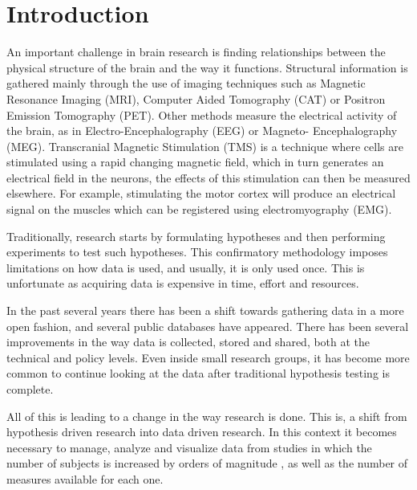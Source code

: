 \documentclass[utf8,paper]{frontiersSCNS} %
\begin{document}




\section{Introduction}


An important challenge in brain research is finding relationships between the physical structure of the brain and the way it functions. Structural information is gathered mainly through the use of imaging techniques such as Magnetic Resonance Imaging (MRI), Computer Aided Tomography (CAT) or Positron Emission Tomography (PET). Other methods measure the electrical activity of the brain, as in Electro-Encephalography (EEG) or Magneto- Encephalography (MEG). Transcranial Magnetic Stimulation (TMS) is a technique where cells are stimulated using a rapid changing magnetic field, which in turn generates an electrical field in the neurons, the effects of this stimulation can then be measured elsewhere. For example, stimulating the motor cortex will produce an electrical signal on the muscles which can be registered using electromyography (EMG).
					
Traditionally, research starts by formulating hypotheses and then performing experiments to test such hypotheses. This  confirmatory methodology imposes limitations on how data is used, and usually, it is only used once. This is unfortunate as acquiring data is expensive in time, effort and resources.
					
In the past several years there has been a shift towards gathering data in a more open fashion, and several public databases have appeared. There has been several improvements in the way data is collected, stored and shared, both at the technical and policy levels. Even inside small research groups, it has become more common to continue looking at the data after traditional hypothesis testing is complete.
				
All of this is leading to a change in the way research is done. This is, a shift from hypothesis driven research into data driven research. In this context it  becomes necessary to manage, analyze and visualize data from studies in which the number of subjects is increased by orders of magnitude , as well as the number of measures available for each one. 
				
\end{document}
